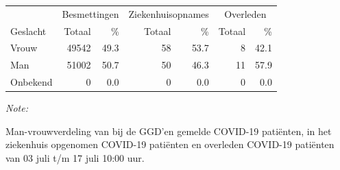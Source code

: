 \documentclass[
  english,
  man,floatsintext]{apa6}
\begin{document}
\begin{table}
\centering\begingroup\fontsize{11}{13}\selectfont

\begin{threeparttable}
\begin{tabular}{lrrrrrr}
\toprule
\multicolumn{1}{c}{ } & \multicolumn{2}{c}{Besmettingen} & \multicolumn{2}{c}{Ziekenhuisopnames} & \multicolumn{2}{c}{Overleden} \\
\cmidrule(l{3pt}r{3pt}){2-3} \cmidrule(l{3pt}r{3pt}){4-5} \cmidrule(l{3pt}r{3pt}){6-7}
Geslacht & Totaal & \% & Totaal & \% & Totaal & \%\\
\midrule
Vrouw & 49542 & 49.3 & 58 & 53.7 & 8 & 42.1\\
Man & 51002 & 50.7 & 50 & 46.3 & 11 & 57.9\\
Onbekend & 0 & 0.0 & 0 & 0.0 & 0 & 0.0\\
\bottomrule
\end{tabular}
\begin{tablenotes}
\item \textit{Note: } 
\item Man-vrouwverdeling van bij de GGD’en gemelde COVID-19 patiënten, in het ziekenhuis opgenomen COVID-19 patiënten en overleden COVID-19 patiënten van 03 juli t/m 17 juli 10:00 uur.
\end{tablenotes}
\end{threeparttable}
\endgroup{}
\end{table}
\newpage
\end{document}
